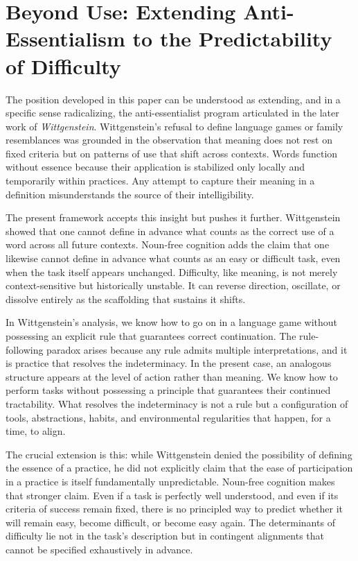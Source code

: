 \documentclass[12pt]{article}
\begin{document}
\section{Beyond Use: Extending Anti-Essentialism to the Predictability of Difficulty}

The position developed in this paper can be understood as extending, and in a specific sense radicalizing, the anti-essentialist program articulated in the later work of \emph{Wittgenstein}. Wittgenstein’s refusal to define language games or family resemblances was grounded in the observation that meaning does not rest on fixed criteria but on patterns of use that shift across contexts. Words function without essence because their application is stabilized only locally and temporarily within practices. Any attempt to capture their meaning in a definition misunderstands the source of their intelligibility.

The present framework accepts this insight but pushes it further. Wittgenstein showed that one cannot define in advance what counts as the correct use of a word across all future contexts. Noun-free cognition adds the claim that one likewise cannot define in advance what counts as an easy or difficult task, even when the task itself appears unchanged. Difficulty, like meaning, is not merely context-sensitive but historically unstable. It can reverse direction, oscillate, or dissolve entirely as the scaffolding that sustains it shifts.

In Wittgenstein’s analysis, we know how to go on in a language game without possessing an explicit rule that guarantees correct continuation. The rule-following paradox arises because any rule admits multiple interpretations, and it is practice that resolves the indeterminacy. In the present case, an analogous structure appears at the level of action rather than meaning. We know how to perform tasks without possessing a principle that guarantees their continued tractability. What resolves the indeterminacy is not a rule but a configuration of tools, abstractions, habits, and environmental regularities that happen, for a time, to align.

The crucial extension is this: while Wittgenstein denied the possibility of defining the essence of a practice, he did not explicitly claim that the ease of participation in a practice is itself fundamentally unpredictable. Noun-free cognition makes that stronger claim. Even if a task is perfectly well understood, and even if its criteria of success remain fixed, there is no principled way to predict whether it will remain easy, become difficult, or become easy again. The determinants of difficulty lie not in the task’s description but in contingent alignments that cannot be specified exhaustively in advance.
\end{document}
